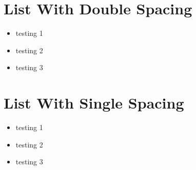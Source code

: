 \part{List With Double Spacing}
\label{listwithdoublespacing}

\begin{itemize}
\item testing 1

\item testing 2

\item testing 3

\end{itemize}

\part{List With Single Spacing}
\label{listwithsinglespacing}

\begin{itemize}
\item testing 1

\item testing 2

\item testing 3

\end{itemize}
